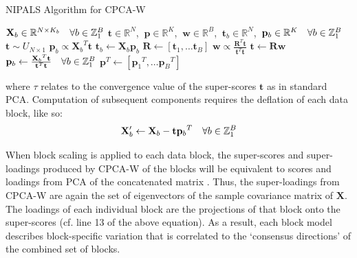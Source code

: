 \begin{algorithm}[H]
\caption{NIPALS Algorithm for CPCA-W}
\label{algorithm.3.4}
\begin{algorithmic}[1]
\REQUIRE $\mathbf{X}_b \in \mathbb{R}^{N \times K_b}
          \quad \forall b \in \mathbb{Z}_{1}^{B}$
\ENSURE $\mathbf{t} \in \mathbb{R}^N$,%
      $\:\mathbf{p} \in \mathbb{R}^K$,%
      $\:\mathbf{w} \in \mathbb{R}^B$,%
      $\:\mathbf{t}_b \in \mathbb{R}^N$,%
      $\:\mathbf{p}_b \in \mathbb{R}^K \quad \forall b \in \mathbb{Z}_{1}^{B}$
\STATE $\mathbf{t} \sim U_{N \times 1}$ 
\REPEAT
    \STATE $\mathbf{p}_b \propto {\mathbf{X}_b}^T \mathbf{t}$
    \STATE $\mathbf{t}_b \gets \mathbf{X}_b \mathbf{p}_b$
  \ENDFOR
  \STATE $\mathbf{R} \gets [\mathbf{t}_1, \dots \mathbf{t}_B]$
  \STATE $\mathbf{w} \propto \tfrac{\mathbf{R}^T \mathbf{t}}
                                   {\mathbf{t}^T \mathbf{t}}$
  \STATE $\mathbf{t} \gets \mathbf{R} \mathbf{w}$
\UNTIL{$\tau < \varepsilon$}
\STATE $\mathbf{p}_b \gets \tfrac{{\mathbf{X}_b}^T \mathbf{t}}
                                 {\mathbf{t}^T \mathbf{t}}
        \quad \forall b \in \mathbb{Z}_{1}^{B}$
\STATE $\mathbf{p}^T \gets [{\mathbf{p}_1}^T, \dots {\mathbf{p}_B}^T]$
\end{algorithmic}
\end{algorithm}

\begin{doublespace}
where $\tau$ relates to the convergence value of the super-scores
$\mathbf{t}$ as in standard PCA. Computation of subsequent components requires
the deflation of each data block, like so:
\begin{equation}
\mathbf{X}_b' \gets \mathbf{X}_b - \mathbf{t} {\mathbf{p}_b}^T
 \quad \forall b \in \mathbb{Z}_{1}^{B}
\end{equation}

When block scaling is applied to each data block, the super-scores and
super-loadings produced by CPCA-W of the blocks will be equivalent to scores
and loadings from PCA of the concatenated matrix
\cite{westerhuis:jchemo1998,smilde:jchemo2003}. Thus, the super-loadings
from CPCA-W are again the set of eigenvectors of the sample covariance matrix
of $\mathbf{X}$. The loadings of each individual block are the projections of
that block onto the super-scores (cf. line 13 of the above equation). As a
result, each block model describes block-specific variation that is correlated
to the `consensus directions' of the combined set of blocks.
\end{doublespace}


